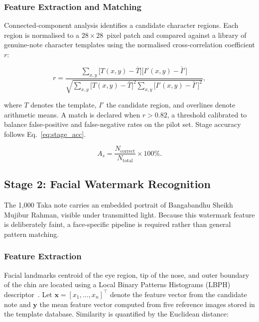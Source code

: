 \documentclass[10pt,a4paper,twocolumn,twoside]{article}
\begin{document}
\subsubsection{Feature Extraction and Matching}

Connected-component analysis identifies a candidate character
regions. Each region is normalised to a $28 \times 28$~pixel patch
and compared against a library of genuine-note character templates
using the normalised cross-correlation coefficient $r$:

\begin{equation}
  r = \frac
    {\sum_{x,y}\bigl[T(x,y)-\bar{T}\bigr]\bigl[I'(x,y)-\bar{I}'\bigr]}
    {\sqrt{
      \sum_{x,y}\bigl[T(x,y)-\bar{T}\bigr]^2
      \sum_{x,y}\bigl[I'(x,y)-\bar{I}'\bigr]^2
    }},
  \label{eq:ncc}
\end{equation}

where $T$ denotes the template, $I'$ the candidate region, and
overlines denote arithmetic means. A match is declared when
$r > 0.82$, a threshold calibrated to balance false-positive and
false-negative rates on the pilot set. Stage accuracy follows
Eq.~\eqref{eq:stage_acc}.

\begin{equation}
  A_s = \frac{N_{\mathrm{correct}}}{N_{\mathrm{total}}}
              \times 100\%.
  \label{eq:stage_acc}
\end{equation}

\subsection{Stage 2: Facial Watermark Recognition}
\label{subsec:face}

The 1,000 Taka note carries an embedded portrait of Bangabandhu
Sheikh Mujibur Rahman, visible under transmitted light. Because
this watermark feature is deliberately faint, a face-specific
pipeline is required rather than general pattern matching.

\subsubsection{Feature Extraction}

Facial landmarks centroid of the eye region, tip of the nose,
and outer boundary of the chin are located using a Local Binary
Patterns Histograms (LBPH) descriptor~\cite{hasanuzzaman2012}.
Let $\mathbf{x} = [x_1, \dots, x_n]^\top$ denote the feature vector from the candidate note and $\mathbf{y}$ the mean feature vector computed from five reference images stored in the template database. Similarity is quantified by the Euclidean distance:
\end{document}
